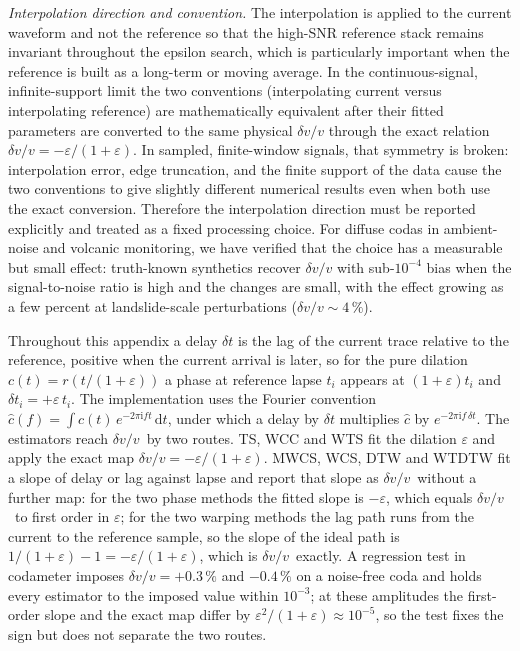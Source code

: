 \documentclass[
  referee]{gji}
\providecommand{\dvv}{\ensuremath{\delta v/v}}
\begin{document}
\emph{Interpolation direction and convention.} The interpolation is
applied to the current waveform and not the reference so that the
high-SNR reference stack remains invariant throughout the epsilon
search, which is particularly important when the reference is built as a
long-term or moving average. In the continuous-signal, infinite-support
limit the two conventions (interpolating current versus interpolating
reference) are mathematically equivalent after their fitted parameters
are converted to the same physical \(\dvv\) through the exact relation
\(\dvv = -\varepsilon/(1+\varepsilon)\). In sampled, finite-window
signals, that symmetry is broken: interpolation error, edge truncation,
and the finite support of the data cause the two conventions to give
slightly different numerical results even when both use the exact
conversion. Therefore the interpolation direction must be reported
explicitly and treated as a fixed processing choice. For diffuse codas
in ambient-noise and volcanic monitoring, we have verified that the
choice has a measurable but small effect: truth-known synthetics recover
\(\dvv\) with sub-\(10^{-4}\) bias when the signal-to-noise ratio is
high and the changes are small, with the effect growing as a few percent
at landslide-scale perturbations (\(\dvv\sim4\,\%\)).

Throughout this appendix a delay \(\delta t\) is the lag of the current
trace relative to the reference, positive when the current arrival is
later, so for the pure dilation \(c(t)=r(t/(1+\varepsilon))\) a phase at
reference lapse \(t_i\) appears at \((1+\varepsilon)t_i\) and
\(\delta t_i=+\varepsilon\,t_i\). The implementation uses the Fourier
convention
\(\hat c(f)=\int c(t)\,e^{-2\pi\mathrm{i} f t}\,\mathrm{d}t\), under
which a delay by \(\delta t\) multiplies \(\hat c\) by
\(e^{-2\pi\mathrm{i} f\,\delta t}\). The estimators reach \dvv~by two
routes. TS, WCC and WTS fit the dilation \(\varepsilon\) and apply the
exact map \(\dvv=-\varepsilon/(1+\varepsilon)\). MWCS, WCS, DTW and
WTDTW fit a slope of delay or lag against lapse and report that slope as
\dvv~without a further map: for the two phase methods the fitted slope
is \(-\varepsilon\), which equals \dvv~to first order in
\(\varepsilon\); for the two warping methods the lag path runs from the
current to the reference sample, so the slope of the ideal path is
\(1/(1+\varepsilon)-1=-\varepsilon/(1+\varepsilon)\), which is
\dvv~exactly. A regression test in codameter imposes \(\dvv=+0.3\,\%\)
and \(-0.4\,\%\) on a noise-free coda and holds every estimator to the
imposed value within \(10^{-3}\); at these amplitudes the first-order
slope and the exact map differ by
\(\varepsilon^2/(1+\varepsilon)\approx10^{-5}\), so the test fixes the
sign but does not separate the two routes.
\end{document}
